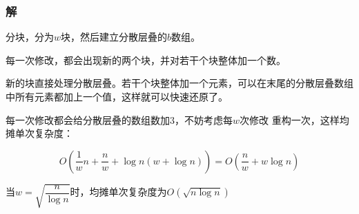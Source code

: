 \documentclass[10pt]{beamer}
\begin{document}
	\begin{frame}
		\frametitle{解}
	
		分块，分为$w$块，然后建立分散层叠的$b$数组。

		每一次修改，都会出现新的两个块，并对若干个块整体加一个数。
		
		新的块直接处理分散层叠。若干个块整体加一个元素，可以在末尾的分散层叠数组中所有元素都加上一个值，这样就可以快速还原了。

		每一次修改都会给分散层叠的数组数加$3$，不妨考虑每$w$次修改 重构一次，这样均摊单次复杂度：

		$$
		O(\dfrac 1w n+\dfrac nw+\log n(w+\log n))=O(\dfrac nw+w\log n)
		$$

		当$w=\sqrt{\dfrac n{\log n}}$时，均摊单次复杂度为$O(\sqrt{n\log n})$
	
	\end{frame}
\end{document}
